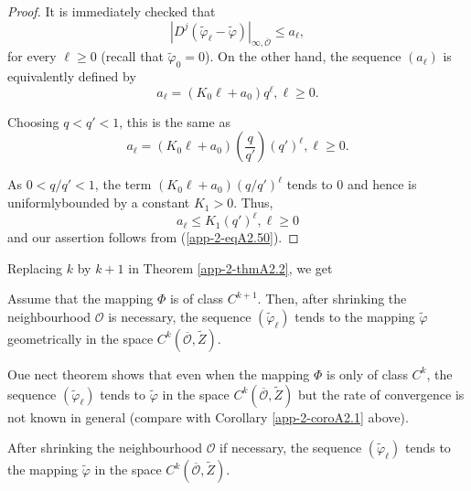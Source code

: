 \begin{proof}
It is immediately checked that
\begin{equation*}
|D^{j}(\widetilde{\varphi}_{\ell} - \widetilde{\varphi})|_{\infty,
  \overline{\mathscr{O}}} \leq a_{\ell},\tag{A2.50}\label{app-2-eqA2.50}
\end{equation*}
for every $\ell \geq 0$ (recall that $\widetilde{\varphi}_{0} =
0$). On the other hand, the sequence $(a_{\ell})$ is equivalently
defined by 
$$
a_{\ell} = (K_{0}\ell + a_{0})q^{\ell}, \ell \geq 0.
$$

Choosing $q < q' < 1$, this is the same as
$$
a_{\ell} = (K_{0}\ell + a_{0}) \left(\frac{q}{q'}\right) (q')^{\ell},
\ell \geq 0.
$$

As $0 < q/q' < 1$, the term $(K_{0}\ell + a_{0})(q/q')^{\ell}$ tends
to 0 and hence is uniformly\pageoriginale bounded by a constant $K_{1}
> 0$. Thus, 
$$
a_{\ell} \leq K_{1}(q')^{\ell}, \ell \geq 0
$$
and our assertion follows from (\ref{app-2-eqA2.50}).
\end{proof}

Replacing $k$ by $k + 1$ in Theorem \ref{app-2-thmA2.2}, we get

\begin{alphcorollary}\label{app-2-coroA2.1}%
Assume that the mapping $\Phi$ is of class $C^{k+1}$. Then, after
shrinking the neighbourhood $\mathscr{O}$ is necessary, the sequence
$(\widetilde{\varphi}_{\ell})$ tends to the mapping
$\widetilde{\varphi}$ geometrically in the space
$C^{k}(\overline{\mathscr{O}}, \widetilde{Z})$.
\end{alphcorollary}

Oue nect theorem shows that even when the mapping $\Phi$ is only of
class $C^{k}$, the sequence $(\widetilde{\varphi}_{\ell})$ tends to
$\widetilde{\varphi}$ in the space $C^{k}(\overline{\mathscr{O}},
\widetilde{Z})$ but the rate of convergence is not known in general
(compare with Corollary \ref{app-2-coroA2.1} above).

\begin{alphtheorem}\label{app-2-thmA2.3}%
After shrinking the neighbourhood $\mathscr{O}$ if necessary, the
sequence $(\widetilde{\varphi}_{\ell})$ tends to the mapping
$\widetilde{\varphi}$ in the space $C^{k}(\overline{\mathscr{O}},
\widetilde{Z})$. 
\end{alphtheorem}

